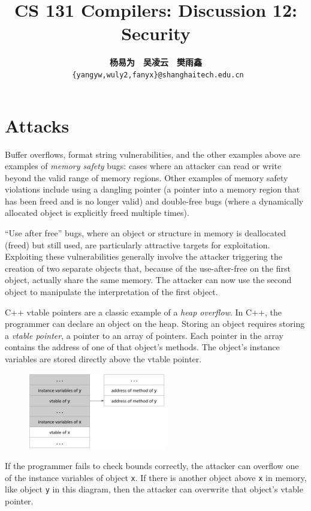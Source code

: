 \documentclass[a4paper]{exam}
\title{CS 131 Compilers: Discussion 12: Security}
\author{\textbf{杨易为}~~\textbf{吴凌云}~~\textbf{樊雨鑫} \\ \texttt{ \{yangyw,wuly2,fanyx\}@shanghaitech.edu.cn}}
\theoremstyle{definition}
\begin{document}
\maketitle
\section{Attacks\cite{cs161lec12}}


Buffer overflows, format string vulnerabilities, and the other examples
above are examples of \emph{memory safety} bugs: cases where an attacker
can read or write beyond the valid range of memory regions. Other
examples of memory safety violations include using a dangling pointer (a
pointer into a memory region that has been freed and is no longer valid)
and double-free bugs (where a dynamically allocated object is explicitly
freed multiple times).

``Use after free'' bugs, where an object or structure in memory is
deallocated (freed) but still used, are particularly attractive targets
for exploitation. Exploiting these vulnerabilities generally involve the
attacker triggering the creation of two separate objects that, because
of the use-after-free on the first object, actually share the same
memory. The attacker can now use the second object to manipulate the
interpretation of the first object.

C++ vtable pointers are a classic example of a \emph{heap overflow}. In
C++, the programmer can declare an object on the heap. Storing an object
requires storing a \emph{vtable pointer}, a pointer to an array of
pointers. Each pointer in the array contains the address of one of that
object's methods. The object's instance variables are stored directly
above the vtable pointer.

\begin{figure}
\centering
\includegraphics[width=6cm]{./img/vtable.png}
\caption{}
\end{figure}

If the programmer fails to check bounds correctly, the attacker can
overflow one of the instance variables of object \texttt{x}. If there is
another object above \texttt{x} in memory, like object \texttt{y} in
this diagram, then the attacker can overwrite that object's vtable
pointer.
\end{document}
